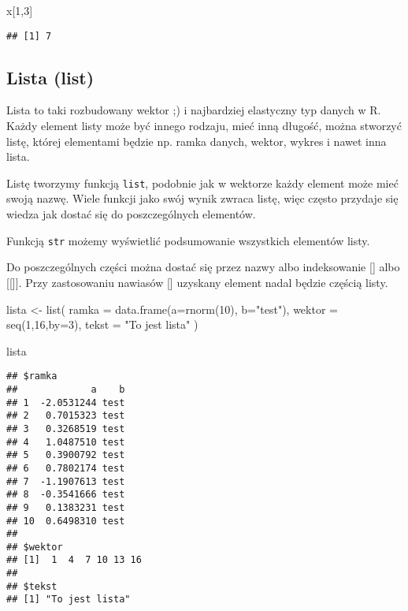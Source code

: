 \documentclass[
]{book}
\newenvironment{Shaded}{\begin{snugshade}}{\end{snugshade}}
\newcommand{\AttributeTok}[1]{\textcolor[rgb]{0.77,0.63,0.00}{#1}}
\newcommand{\DecValTok}[1]{\textcolor[rgb]{0.00,0.00,0.81}{#1}}
\newcommand{\FunctionTok}[1]{\textcolor[rgb]{0.00,0.00,0.00}{#1}}
\newcommand{\NormalTok}[1]{#1}
\newcommand{\OtherTok}[1]{\textcolor[rgb]{0.56,0.35,0.01}{#1}}
\newcommand{\StringTok}[1]{\textcolor[rgb]{0.31,0.60,0.02}{#1}}
\begin{document}
\begin{Shaded}
\begin{Highlighting}[]
\NormalTok{x[}\DecValTok{1}\NormalTok{,}\DecValTok{3}\NormalTok{]}
\end{Highlighting}
\end{Shaded}

\begin{verbatim}
## [1] 7
\end{verbatim}

\hypertarget{lista-list}{%
\subsection{Lista (list)}\label{lista-list}}

Lista to taki rozbudowany wektor ;) i najbardziej elastyczny typ danych w R. Każdy element listy może być innego rodzaju, mieć inną długość, można stworzyć listę, której elementami będzie np. ramka danych, wektor, wykres i nawet inna lista.

Listę tworzymy funkcją \texttt{list}, podobnie jak w wektorze każdy element może mieć swoją nazwę. Wiele funkcji jako swój wynik zwraca listę, więc często przydaje się wiedza jak dostać się do poszczególnych elementów.

Funkcją \texttt{str} możemy wyświetlić podsumowanie wszystkich elementów listy.

Do poszczególnych części można dostać się przez nazwy albo indeksowanie {[}{]} albo {[}{[}{]}{]}. Przy zastosowaniu nawiasów {[}{]} uzyskany element nadal będzie częścią listy.

\begin{Shaded}
\begin{Highlighting}[]
\NormalTok{lista }\OtherTok{\textless{}{-}} \FunctionTok{list}\NormalTok{( }\AttributeTok{ramka =} \FunctionTok{data.frame}\NormalTok{(}\AttributeTok{a=}\FunctionTok{rnorm}\NormalTok{(}\DecValTok{10}\NormalTok{), }\AttributeTok{b=}\StringTok{"test"}\NormalTok{), }
               \AttributeTok{wektor =} \FunctionTok{seq}\NormalTok{(}\DecValTok{1}\NormalTok{,}\DecValTok{16}\NormalTok{,}\AttributeTok{by=}\DecValTok{3}\NormalTok{), }
               \AttributeTok{tekst =} \StringTok{"To jest lista"}\NormalTok{ )}

\NormalTok{lista}
\end{Highlighting}
\end{Shaded}

\begin{verbatim}
## $ramka
##             a    b
## 1  -2.0531244 test
## 2   0.7015323 test
## 3   0.3268519 test
## 4   1.0487510 test
## 5   0.3900792 test
## 6   0.7802174 test
## 7  -1.1907613 test
## 8  -0.3541666 test
## 9   0.1383231 test
## 10  0.6498310 test
## 
## $wektor
## [1]  1  4  7 10 13 16
## 
## $tekst
## [1] "To jest lista"
\end{verbatim}
\end{document}

